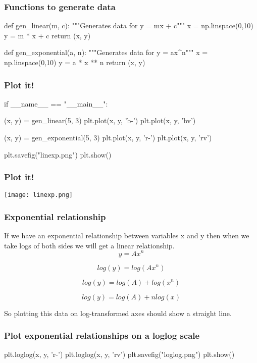 \documentclass{beamer}
\begin{document}
\begin{frame}[fragile]
\frametitle{Functions to generate data}
\begin{code}
def gen_linear(m, c):
    """Generates data for y = mx + c"""
    x = np.linspace(0,10)
    y = m * x + c
    return (x, y)

def gen_exponential(a, n):
    """Generates data for y = ax^n"""
    x = np.linspace(0,10)
    y = a * x ** n
    return (x, y)
\end{code}

\end{frame}


\begin{frame}[fragile]
\frametitle{Plot it!}
\begin{code}
if __name__ == "__main__":

    (x, y) = gen_linear(5, 3)
    plt.plot(x, y, 'b-')
    plt.plot(x, y, 'bv')

    (x, y) = gen_exponential(5, 3)
    plt.plot(x, y, 'r-')
    plt.plot(x, y, 'rv')

    plt.savefig("linexp.png")
    plt.show()
\end{code}
\end{frame}

\begin{frame}[fragile]
\frametitle{Plot it!}
\texttt{[image: linexp.png]}
\end{frame}

\begin{frame}[fragile]
\frametitle{Exponential relationship}
If we have an exponential relationship between variables x and y then when we take logs of both sides we will get a linear relationship. 
\[ y = Ax^n \]

\[log(y) = log(Ax^n) \]

\[ log(y) = log(A) + log(x^n) \]

\[ log(y) = log(A) + n log(x) \]

So plotting this data on log-transformed axes should show a straight line.

\end{frame}


\begin{frame}[fragile]
\frametitle{Plot exponential relationships on a loglog scale}
\begin{code}
    plt.loglog(x, y, 'r-')
    plt.loglog(x, y, 'rv')
    plt.savefig("loglog.png")
    plt.show()
\end{code}
\end{frame}
\end{document}
